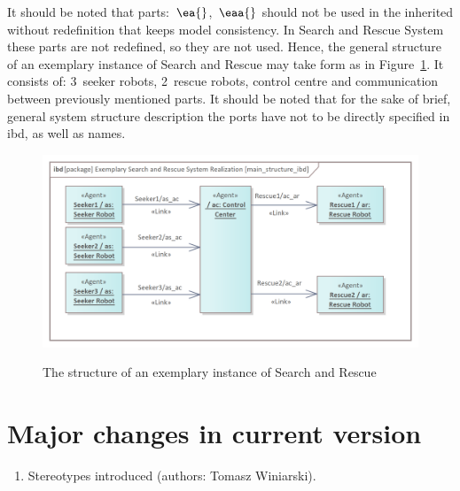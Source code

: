 \documentclass[11pt,oneside,a4paper]{article}
\newcommand{\Figure}[0]{Figure}
\begin{document}
It should be noted that \System{} parts:~$\ea{}$,~$\eaa{}$ should not be used in the inherited \Systems{} without redefinition that keeps model consistency. In Search and Rescue System these parts are not redefined, so they are not used. Hence, the general structure of an exemplary instance of Search and Rescue \System{} may take form as in \Figure{}~\ref{fig:sar_instance_ibd}. It consists of: 3~seeker robots, 2~rescue robots, control centre and communication \Links{} between previously mentioned parts. It should be noted that for the sake of brief, general system structure description the ports have not to be directly specified in ibd, as well as \Links{} names. 


\begin{figure}[H]
	\centering
	\begin{center}
		{\includegraphics[width=0.8\columnwidth]{img/search_and_rescue_system_instance/main_structure_ibd.png}}
	\end{center}
	\caption{The structure of an exemplary instance of Search and Rescue \System{}}
	\label{fig:sar_instance_ibd}
\end{figure}



\section{Major changes in current version}
\label{sec:major-changes}

\begin{enumerate}
	\item Stereotypes introduced (authors: Tomasz Winiarski).
\end{enumerate}

\AtNextBibliography{\small}
\printbibliography
\end{document}
